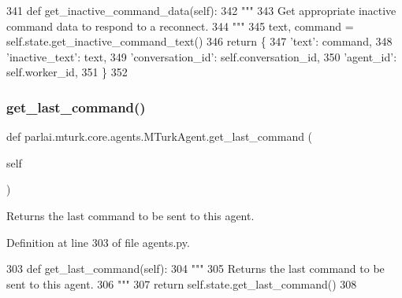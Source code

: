 \begin{DoxyCode}
341     \textcolor{keyword}{def }get\_inactive\_command\_data(self):
342         \textcolor{stringliteral}{"""}
343 \textcolor{stringliteral}{        Get appropriate inactive command data to respond to a reconnect.}
344 \textcolor{stringliteral}{        """}
345         text, command = self.state.get\_inactive\_command\_text()
346         \textcolor{keywordflow}{return} \{
347             \textcolor{stringliteral}{'text'}: command,
348             \textcolor{stringliteral}{'inactive\_text'}: text,
349             \textcolor{stringliteral}{'conversation\_id'}: self.conversation\_id,
350             \textcolor{stringliteral}{'agent\_id'}: self.worker\_id,
351         \}
352 
\end{DoxyCode}
\mbox{\label{classparlai_1_1mturk_1_1core_1_1agents_1_1MTurkAgent_a7d8989acb53debf63fc11246510f83b7}} 
\subsubsection{\texorpdfstring{get\+\_\+last\+\_\+command()}{get\_last\_command()}}
{\footnotesize\ttfamily def parlai.\+mturk.\+core.\+agents.\+M\+Turk\+Agent.\+get\+\_\+last\+\_\+command (\begin{DoxyParamCaption}\item[{}]{self }\end{DoxyParamCaption})}

\begin{DoxyVerb}Returns the last command to be sent to this agent.
\end{DoxyVerb}
 

Definition at line 303 of file agents.\+py.


\begin{DoxyCode}
303     \textcolor{keyword}{def }get\_last\_command(self):
304         \textcolor{stringliteral}{"""}
305 \textcolor{stringliteral}{        Returns the last command to be sent to this agent.}
306 \textcolor{stringliteral}{        """}
307         \textcolor{keywordflow}{return} self.state.get\_last\_command()
308 
\end{DoxyCode}
\mbox{\label{classparlai_1_1mturk_1_1core_1_1agents_1_1MTurkAgent_ae941b277cbfee3e76b543b780ca804f9}} 
